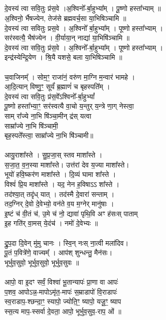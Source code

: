 \subsection{}
दे॒वस्य॑ त्वा सवि॒तुः प्र॑स॒वे ।अ॒श्विनो᳚-र्बा॒हुभ्या᳚म् । पू॒ष्णो हस्ता᳚भ्याम् ॥\\
अ॒श्विनो॒ र्भैषज्येन,  तेज॑से ब्रह्मवर्च॒सा या॒भिषिञ्चामि ॥ \\
दे॒वस्य॑ त्वा सवितुः प्रस॒वे । अ॒श्विनो᳚ र्बा॒हुभ्या᳚म् । पूष्णो हस्ता᳚भ्याम् ।\\
सर॑स्वत्यै॒ भैष॑ज्येन । वी॒र्याया॒न् नाद्या॑ या॒भिषि॑ञ्चामि ॥ \\
दे॒वस्य॑ त्वा सवि॒तुः प्र॑स॒वे । अ॒श्विनो᳚-र्बा॒हुभ्या᳚म् । पूष्णो हस्ता᳚भ्याम् ।\\
इन्द्र॑स्येन्द्रि॒येण । श्रि॒यै यशसे॒ बला या॒भिषिञ्चामि ॥\\
\\
च॒वाजिनम्᳚ । सोम॒ꣳ॒ राजा॑नं॒ वरु॑ण मा॒ग्नि म॒न्वार॑ भामहे ।\\
आ॒दि॒त्यान् विष्णु॒ꣳ॒ सूर्यं॑ ब्र॒ह्माणं॑ च बृहस्पति᳚म् ।\\
दे॒वस्य॑ त्वा सवि॒तुः प्र॑स॒वे᳚ऽश्विनो᳚-र्बा॒हुभ्यां᳚ \\
पू॒ष्णो हस्ता᳚भ्या॒ꣳ॒ सर॑स्वत्यै वा॒चो य॒न्तुर् य॒न्त्रे णा॒ग् नेस्त्वा॒ \\
साम् रा᳚ज्ये ना॒भि षि॑ञ्चा॒मीन् द्र॑स् यत्वा \\
साम्रा᳚ज्ये ना॒भि षि॑ञ्चामी॒\\
बृह॒स्पते᳚स्त्वा॒ साम्रा᳚ज्ये ना॒भि षि॑ञ्चामी॥\\
\\
आयु॒राशा᳚स्ते । सु॒प्र॒जा॒स् स्तव माशा᳚स्ते ।\\
स॒जा॒त॒ व॒न॒स्या माशा᳚स्ते। उत्त॑रां देव य॒ज्या माशा᳚स्ते। \\
भूयो॑ हवि॒ष्कर॑ण माशा᳚स्ते । दि॒व्यं घामा शा᳚स्ते ।\\
विश्वं॑ प्रि॒य माशा᳚स्ते । यद॒ नेन ह॒विषाऽऽ शा᳚स्ते ।\\
तद॑श्या॒त् तदृ॑ध् यात् । तद॑स्मै दे॒वारा॑ सन्ताम् ।\\
तद॒ग्निर् दे॒वो दे॒वेभ्यो॒ वन॑ते व॒य म॒ग्नेर् मानु॑षाः ।\\
इ॒ष्टं च॑ वी॒तं च॑, उ॒मे च॑ नो॒ द्यावा॑ पृथि॒वि अꣳ ह॑सःस् पाताम् \\
इ॒ह गति॑र् वा॒मस् ये॒दंच॑ । नमो॑ दे॒वेभ्यः ॥\\
\\
द्रु॒प॒दा दि॒वेन् मु॑मु चानः । स्वि॒न् नःस् ना॒त्वी मला॑दिव। \\
पू॒तं प॒वित्रे॑णे॒ वाज्यम्᳚ । आप॑श् शुन्धन्तु॒ मैन॑सः। \\
भूर्भुव॒सुवो॒ भूर्भुव॒सुवो॒ भूर्भुव॒सुवः ॥\\
\\
आपो॒ वा इ॒दꣳ सर्वं॒ विश्वा॑ भू॒तान्यापः॑ प्रा॒णा वा आपः॑ \\
प॒शव॒ आपोऽन्न॒-मापोऽमृ॑त॒-मापः॑ स॒म्राडापो॑ वि॒राडापः॑ \\
स्व॒राडाप॒-श्छन्दा॒ꣳ॒ स्यापो॒ ज्योति॒ꣳ॒ ष्यापो॒ यजू॒ꣳ॒ ष्याप \\
स्स॒त्य माप॒-स्सर्वा दे॒वता॒ आपो॒ भूर्भुव॒सुव॒-राप॒ ओं ॥\\

